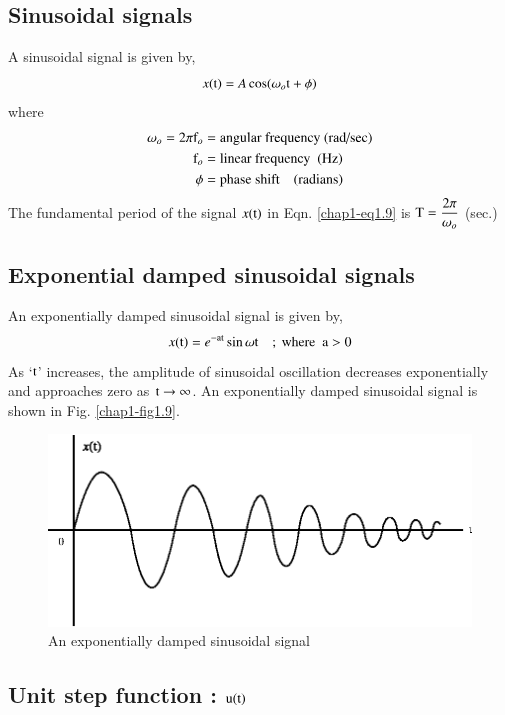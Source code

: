 \subsection{Sinusoidal signals}\label{chap1-eq1.3.2}

A sinusoidal signal is given by,
\begin{equation}
x(\textrm{t})=A\cos (\omega_{o}\textrm{t}+\phi)\label{chap1-eq1.9}
\end{equation}
where
\begin{align*}
\omega_{o}=2\pi \textrm{f}_{o} &= \text{angular frequency (rad/sec)}\\
\textrm{f}_{o} &= \text{linear frequency~  (Hz)}\\
\phi &= \text{phase shift\quad (radians)}
\end{align*}
The fundamental period of the signal $x(\textrm{t})$ in Eqn. \eqref{chap1-eq1.9} is $\textrm{T}=\dfrac{2\pi}{\omega_{o}}$ (sec.)

\subsection{Exponential damped sinusoidal signals}\label{chap1-sec1.3.3}

An exponentially damped sinusoidal signal is given by,
$$
x(\textrm{t})=e^{-\textrm{at}}\sin \omega \textrm{t}\quad ;~ \text{where~ } \textrm{a} >0
$$
As `$\textrm{t}$' increases, the amplitude of sinusoidal oscillation decreases exponentially and approaches zero as $\textrm{t}\to \infty$. An exponentially damped sinusoidal signal is shown in Fig. \ref{chap1-fig1.9}.
\begin{figure}[H]
\centering
\includegraphics{src/chap1/fig10.eps}
\caption{An exponentially damped sinusoidal signal}\label{chap1-fig1.10}
\end{figure}

\subsection{Unit step function : $\textrm{u}(\textrm{t})$}\label{chap1-sec1.3.4}

